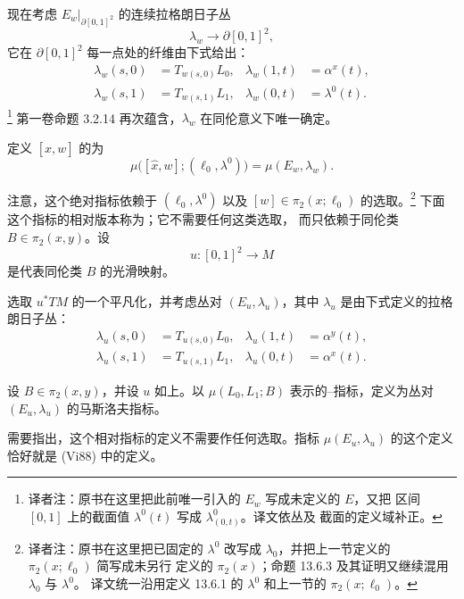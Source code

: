 现在考虑 $E_w|_{\partial[0,1]^2}$ 的连续拉格朗日子丛
\[
  \lambda_w\longrightarrow\partial[0,1]^2,
\]
它在 $\partial[0,1]^2$ 每一点处的纤维由下式给出：
\[
  \begin{aligned}
    \lambda_w(s,0)&=T_{w(s,0)}L_0,
    &\lambda_w(1,t)&=\alpha^x(t),\\
    \lambda_w(s,1)&=T_{w(s,1)}L_1,
    &\lambda_w(0,t)&=\lambda^0(t).
  \end{aligned}
\]
\footnote{译者注：原书在这里把此前唯一引入的 $E_w$ 写成未定义的 $E$，又把
区间 $[0,1]$ 上的截面值 $\lambda^0(t)$ 写成 $\lambda^0_{(0,t)}$。译文依丛及
截面的定义域补正。}
第一卷命题 3.2.14 再次蕴含，$\lambda_w$ 在同伦意义下唯一确定。

\begin{definition}
\label{def:maslov-morse-index}
定义 $[\widehat x,w]$ 的\termMaslovMorseIndex{}为
\[
  \mu\bigl([\widehat x,w];(\ell_0,\lambda^0)\bigr)
  =\mu(E_w,\lambda_w).
\]
\end{definition}

注意，这个绝对指标依赖于 $(\ell_0,\lambda^0)$ 以及
$[w]\in\pi_2(x;\ell_0)$ 的选取。\footnote{译者注：原书在这里把已固定的
$\lambda^0$ 改写成 $\lambda_0$，并把上一节定义的 $\pi_2(x;\ell_0)$ 简写成未另行
定义的 $\pi_2(x)$；命题 13.6.3 及其证明又继续混用 $\lambda_0$ 与 $\lambda^0$。
译文统一沿用定义 13.6.1 的 $\lambda^0$ 和上一节的 $\pi_2(x;\ell_0)$。}
下面这个指标的相对版本称为\termMaslovViterboIndex{}；它不需要任何这类选取，
而只依赖于同伦类 $B\in\pi_2(x,y)$。设
\[
  u:[0,1]^2\longrightarrow M
\]
是代表同伦类 $B$ 的光滑映射。

选取 $u^*TM$ 的一个平凡化，并考虑丛对 $(E_u,\lambda_u)$，其中
$\lambda_u$ 是由下式定义的拉格朗日子丛：
\[
  \begin{aligned}
    \lambda_u(s,0)&=T_{u(s,0)}L_0,
    &\lambda_u(1,t)&=\alpha^y(t),\\
    \lambda_u(s,1)&=T_{u(s,1)}L_1,
    &\lambda_u(0,t)&=\alpha^x(t).
  \end{aligned}
\]

\begin{definition}
\label{def:maslov-viterbo-index}
设 $B\in\pi_2(x,y)$，并设 $u$ 如上。以 $\mu(L_0,L_1;B)$ 表示的\personMaslov{}--\personViterbo{}指标，定义为丛对 $(E_u,\lambda_u)$ 的马斯洛夫指标。
\end{definition}

需要指出，这个相对指标的定义不需要作任何选取。指标
$\mu(E_u,\lambda_u)$ 的这个定义恰好就是 (Vi88) 中\personViterbo{}的定义。

